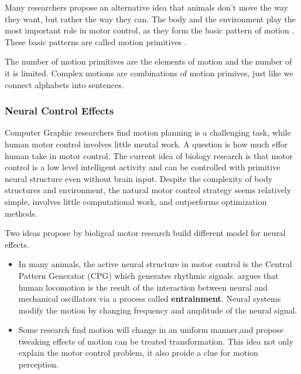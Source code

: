Many researchers propose an alternative idea that animals don’t move the way they want, but rather the way they can. 
The body and the environment play the most important role in motor control, as they form the basic pattern of motion \citep{nishikawa2007neuromechanics}.
These basic patterns are called motion primitives \citep{Poggio2004}.

The number of motion primitives are the elements of motion and the number of it is limited.
Complex motions are combinations of motion primives, just like we connect alphabets into sentences.




\subsubsection*{Neural Control Effects}
Computer Graphic researchers find motion planning is a challenging task, while human motor control involves little mental work.
A question is how much effor human take in motor control.
The current idea of biology research is that motor control is a low level intelligent activity and can be controlled with primitive neural structure even without brain input. 
Despite the complexity of body structures and environment, the natural motor control strategy seems relatively simple, involves little computational work, and outperforms optimization methods. 

Two ideas propose by bioligcal motor research build different model for neural effects.
\begin{itemize}
\item
In many animals, the active neural structure in motor control is the Central Pattern Generator (CPG) which generates rhythmic signals.
\citet{Cohen1988a} argues that human locomotion is the result of the interaction between neural and mechanical oscillators via a process called \textbf{entrainment}.
Neural systems modify the motion by changing frequency and amplitude of the neural signal.

\item
Some research find motion will change in an uniform manner\citep{Viviani1992},and propose tweaking effects of motion can be treated  transformation\citep{flash2007affine}.
This idea not only explain the motor control problem, it also proide a clue for motion perception.

\end{itemize}





